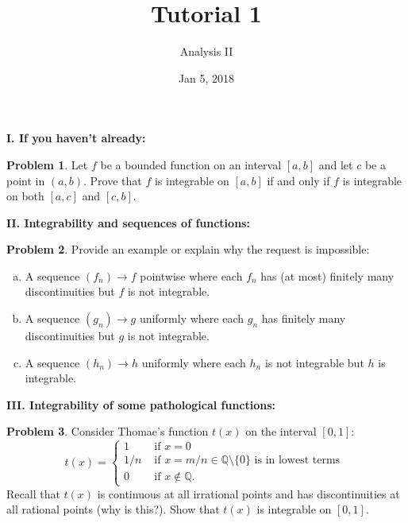 \documentclass{amsart}
\newcommand{\+}[1]{\ensuremath{\mathbf{#1}}}
\theoremstyle{definition}
\newtheorem{prob}{Problem}
\begin{document}
\title{Tutorial 1}
\date{Jan 5, 2018}
\author{Analysis II}

\maketitle



{\bf I. If you haven't already:}

\vspace{3mm}

\begin{prob}
Let $f$ be a bounded function on an interval $[a,b]$ and let $c$ be a point in $(a,b)$.
Prove that $f$ is integrable on $[a,b]$
if and only if $f$ is integrable on both $[a,c]$ and $[c,b]$. 
\end{prob}


\vspace{3mm}
{\bf II. Integrability and sequences of functions:}
\vspace{3mm}

\begin{prob}
 Provide an example or explain why the request is impossible:
 \begin{enumerate}[(a)]
  \item A sequence $(f_n) \to f$ pointwise where each $f_n$ has (at most) finitely many discontinuities
  but $f$ is not integrable.
  \item A sequence $(g_n) \to g$ uniformly where each $g_n$ has finitely many discontinuities
  but $g$ is not integrable.
  \item A sequence $(h_n) \to h$ uniformly where each $h_n$ is not integrable but
   $h$ is  integrable.
 \end{enumerate}
\end{prob}


\vspace{3mm}
{\bf III. Integrability of some pathological functions:}
\vspace{3mm}

\begin{prob}
Consider Thomae's function $t(x)$ on the interval $[0,1]$:
\[
t(x) = \begin{cases}
        1 &\text{ if } x = 0 \\
        1/n &\text{ if } x = m/n \in \mathbb{Q} \setminus \{0\} \text{ is in lowest terms } \\
        0 &\text{ if } x \not\in \mathbb{Q}.
       \end{cases}
\]
Recall that $t(x)$ is continuous at all irrational points and
has discontinuities at all rational points (why is this?).
Show that $t(x)$ is integrable on $[0,1]$. 
\end{prob}
\end{document}
